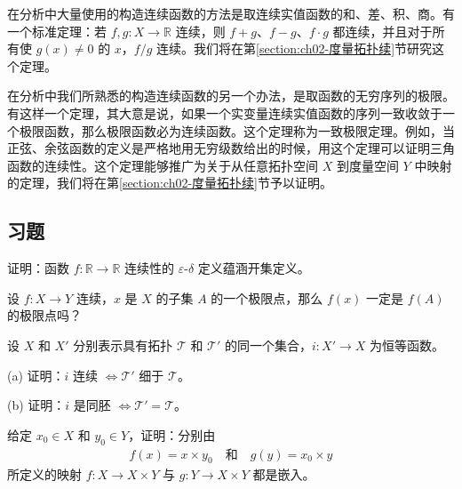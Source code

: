 \documentclass[../../main.tex]{subfiles}
\begin{document}
在分析中大量使用的构造连续函数的方法是取连续实值函数的和、差、积、商。有一个标准定理：若 $f, g: X \rightarrow \mathbb{R}$ 连续，则 $f + g$、$f - g$、$f \cdot g$ 都连续，并且对于所有使 $g(x) \neq 0$ 的 $x$，$f/g$ 连续。我们将在第\cref{section:ch02-度量拓扑续}节研究这个定理。

在分析中我们所熟悉的构造连续函数的另一个办法，是取函数的无穷序列的极限。有这样一个定理，其大意是说，如果一个实变量连续实值函数的序列一致收敛于一个极限函数，那么极限函数必为连续函数。这个定理称为一致极限定理。例如，当正弦、余弦函数的定义是严格地用无穷级数给出的时候，用这个定理可以证明三角函数的连续性。这个定理能够推广为关于从任意拓扑空间 $X$ 到度量空间 $Y$ 中映射的定理，我们将在第\cref{section:ch02-度量拓扑续}节予以证明。

\subsection*{习题}

\begin{exercise}\label{exercise:ch02-连续函数-1}
证明：函数 $f: \mathbb{R} \rightarrow \mathbb{R}$ 连续性的 $\varepsilon$-$\delta$ 定义蕴涵开集定义。
\end{exercise}

\begin{exercise}\label{exercise:ch02-连续函数-2}
设 $f: X \rightarrow Y$ 连续，$x$ 是 $X$ 的子集 $A$ 的一个极限点，那么 $f(x)$ 一定是 $f(A)$ 的极限点吗？
\end{exercise}

\begin{exercise}\label{exercise:ch02-连续函数-3}
设 $X$ 和 $X'$ 分别表示具有拓扑 $\mathcal{T}$ 和 $\mathcal{T}'$ 的同一个集合，$i: X' \rightarrow X$ 为恒等函数。

(a) 证明：$i$ 连续 $\Longleftrightarrow \mathcal{T}'$ 细于 $\mathcal{T}$。

(b) 证明：$i$ 是同胚 $\Longleftrightarrow \mathcal{T}' = \mathcal{T}$。
\end{exercise}

\begin{exercise}\label{exercise:ch02-连续函数-4}
给定 $x_{0} \in X$ 和 $y_{0} \in Y$，证明：分别由
\begin{align*}
f(x) = x \times y_{0} \quad \text{和} \quad g(y) = x_{0} \times y
\end{align*}
所定义的映射 $f: X \rightarrow X \times Y$ 与 $g: Y \rightarrow X \times Y$ 都是嵌入。
\end{exercise}
\end{document}
